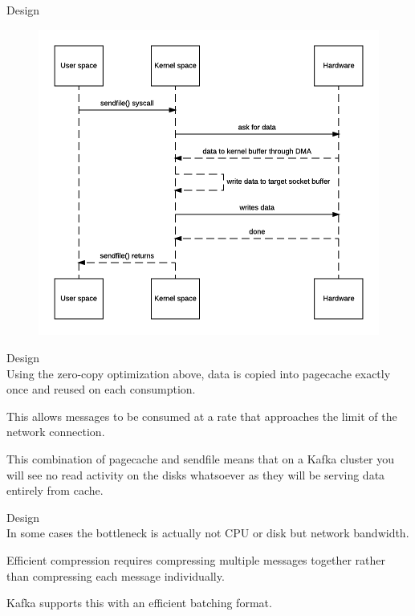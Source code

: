 \begin{frame}[plain,t]{Design} %
     \\
    \vspace{2ex}
    \begin{figure}
        \centering
        \includegraphics[width=0.7\linewidth]{image/0202}
        \label{fig:0202}
    \end{figure}
    
    
\end{frame}
\begin{frame}[plain,t]{Design} %
     \\
    \vspace{2ex}
    Using the zero-copy optimization above, data is copied into pagecache exactly once and reused on each consumption. %
    
    \vspace{2ex}
    This allows messages to be consumed at a rate that approaches the limit of the network connection.
    
    \vspace{2ex}
    This combination of pagecache and sendfile means that on a Kafka cluster 
    you will see no read activity on the disks whatsoever as they will be serving data entirely from cache.
    
\end{frame}
\begin{frame}[plain,t]{Design} %
     \\
    \vspace{2ex}
    In some cases the bottleneck is actually not CPU or disk but network bandwidth.
    
    \vspace{2ex}
    Efficient compression requires compressing multiple messages together rather than compressing each message individually.
    
    \vspace{2ex}
    Kafka supports this with an efficient batching format. 
    
\end{frame}
